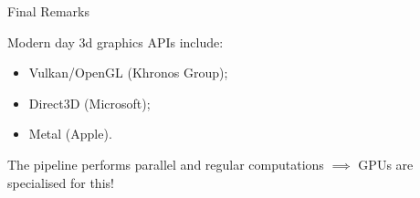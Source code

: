 \documentclass{beamer}
\begin{document}
\begin{frame}{Final Remarks}

	Modern day 3d graphics APIs include:

	\begin{itemize}
		\item Vulkan/OpenGL (Khronos Group);
		\item Direct3D (Microsoft);
		\item Metal (Apple).
	\end{itemize}

	\vskip 1cm

	The pipeline performs parallel and regular computations $\implies$ GPUs are specialised for this!

\end{frame}
\end{document}

